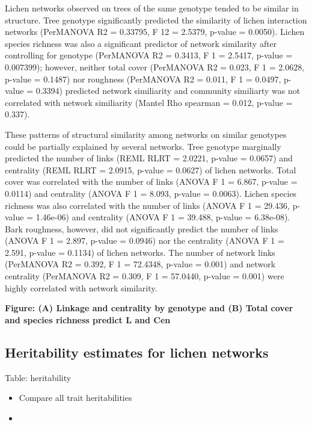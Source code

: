 \documentclass[9pt,twocolumn,twoside,lineno]{pnas-new}
\begin{document}
{Lichen networks observed on trees of the same genotype tended to be
similar in structure. Tree genotype significantly predicted the
similarity of lichen interaction networks (PerMANOVA R2 = 0.33795, F
12 = 2.5379, p-value = 0.0050). Lichen species richness was also a
significant predictor of network similarity after controlling for
genotype (PerMANOVA R2 = 0.3413, F 1 = 2.5417, p-value = 0.007399);
however, neither total cover (PerMANOVA R2 = 0.023, F 1 = 2.0628,
p-value = 0.1487) nor roughness (PerMANOVA R2 = 0.011, F 1 = 0.0497,
p-value = 0.3394) predicted network similiarity and community
similiarty was not correlated with network similiarity (Mantel Rho
spearman = 0.012, p-value = 0.337). 

These patterns of structural similarity among networks on similar
genotypes could be partially explained by several networks. Tree
genotype marginally predicted the number of links (REML RLRT = 2.0221,
p-value = 0.0657) and centrality (REML RLRT = 2.0915, p-value =
0.0627) of lichen networks. Total cover was correlated with the number
of links (ANOVA F 1 = 6.867, p-value = 0.0114) and centrality (ANOVA F
1 = 8.093, p-value = 0.0063). Lichen species richness was also
correlated with the number of links (ANOVA F 1 = 29.436, p-value =
1.46e-06) and centrality (ANOVA F 1 = 39.488, p-value =
6.38e-08). Bark roughness, however, did not significantly predict the
number of links (ANOVA F 1 = 2.897, p-value = 0.0946) nor the
centrality (ANOVA F 1 = 2.591, p-value = 0.1134) of lichen networks.
The number of network links (PerMANOVA R2 = 0.392, F 1 = 72.4348,
p-value = 0.001) and network centrality (PerMANOVA R2 = 0.309, F 1 =
57.0440, p-value = 0.001) were highly correlated with network
similarity.

\textbf{Figure: (A) Linkage and centrality by genotype and (B) Total
  cover and species richness predict L and Cen}


\subsection*{Heritability estimates for lichen networks}

Table: heritability

\begin{itemize}
\item Compare all trait heritabilities
\item 
\end{itemize}

}
\end{document}
